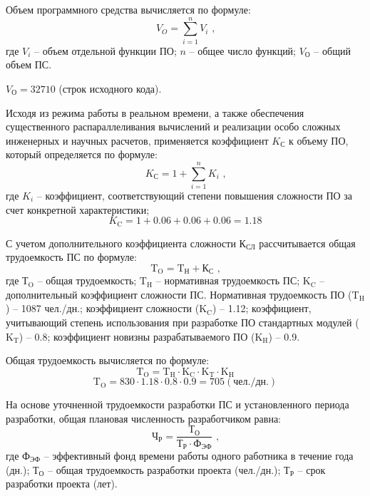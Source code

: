 Объем программного средства вычисляется по формуле:
\begin{equation}
\label{formula:economics:cost:f_vo}
V_{O} = \sum_{i=1}^n V_{i}  \text{ ,}
\end{equation}
где $V_{i}$ -- объем отдельной функции ПО; $n$ -- общее число функций; $V_{\text{О}}$ -- общий объем ПС.

$V_{\text{О}} = 32710$ (строк исходного кода).

Исходя из режима работы в реальном времени, а также обеспечения существенного распараллеливания вычислений и реализации особо сложных инженерных и научных расчетов, применяется коэффициент $K_{\text{С}}$ к объему ПО, который определяется по формуле:
\begin{equation}
\label{formula:economics:cost:f_kc}
K_{\text{С}} = 1 + \sum_{i=1}^n K_{i} \text{ ,}
\end{equation}
где $K_{i}$ -- коэффициент, соответствующий степени повышения сложности ПО за счет конкретной характеристики;
$$K_{\text{C}} = 1 + 0.06 + 0.06 + 0.06 = 1.18$$

С учетом дополнительного коэффициента сложности ${\text{К}}_{\text{СЛ}}$ рассчитывается общая трудоемкость ПС по формуле:
\begin{equation}
\label{formula:economics:cost:f_kcl}
{\text{T}}_{\text{O}} = {\text{T}}_{\text{Н}} + {\text{К}}_{\text{С}} \text{ ,}
\end{equation}
где ${\text{Т}}_{\text{O}}$ -- общая трудоемкость; ${\text{T}}_{\text{H}}$ -- нормативная трудоемкость ПС; ${\text{K}}_{\text{C}}$ -- дополнительный коэффициент сложности ПС. Нормативная трудоемкость ПО (${\text{T}}_{\text{H}}$) -- 1087 чел./дн.; коэффициент сложности (${\text{K}}_{\text{C}}$) -- 1.12; коэффициент, учитывающий степень использования при разработке ПО стандартных модулей (${\text{K}}_{\text{T}}$) -- 0.8; коэффициент новизны разрабатываемого ПО (${\text{K}}_{\text{H}}$) -- 0.9.

Общая трудоемкость вычисляется по формуле:
\begin{equation}
\label{formula:economics:cost:f_to}
{\text{T}}_{\text{O}} = {\text{T}}_{\text{H}} \cdot {\text{K}}_{\text{C}} \cdot {\text{K}}_{\text{T}} \cdot {\text{K}}_{\text{H}}
\end{equation}
$${\text{T}}_{\text{O}} = 830 \cdot 1.18 \cdot 0.8 \cdot 0.9 = 705 (\text{чел./дн.})$$

На основе уточненной трудоемкости разработки ПС и установленного периода разработки, общая плановая численность разработчиком равна:
\begin{equation}
\label{formula:economics:cost:f_chr}
{\text{Ч}}_{\text{Р}} = \frac{ {\text{Т}}_{\text{О}} }{ {\text{Т}}_{\text{Р}} \cdot {\text{Ф}}_{\text{ЭФ}} } \text{ ,}
\end{equation}
где ${\text{Ф}}_{\text{ЭФ}}$ -- эффективный фонд времени работы одного работника в течение года (дн.); ${\text{Т}}_{\text{О}}$ -- общая трудоемкость разработки проекта (чел./дн.); ${\text{Т}}_{\text{Р}}$ -- срок разработки проекта (лет).

